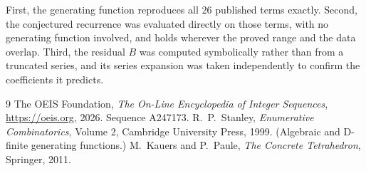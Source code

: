 \documentclass[11pt,a4paper]{article}
\theoremstyle{plain}
\theoremstyle{definition}
\begin{document}
First, the generating function reproduces all $26$ published terms exactly. Second,
the conjectured recurrence was evaluated directly on those terms, with no generating function
involved, and holds wherever the proved range and the data overlap. Third, the residual $B$ was
computed symbolically rather than from a truncated series, and its series expansion was taken
independently to confirm the coefficients it predicts.

\begin{thebibliography}{9}
 The OEIS Foundation, \emph{The On-Line Encyclopedia of Integer Sequences},
\url{https://oeis.org}, 2026. Sequence A247173.
 R.~P.~Stanley, \emph{Enumerative Combinatorics}, Volume 2, Cambridge
University Press, 1999. (Algebraic and D-finite generating functions.)
 M.~Kauers and P.~Paule, \emph{The Concrete Tetrahedron}, Springer, 2011.
\end{thebibliography}
\end{document}
